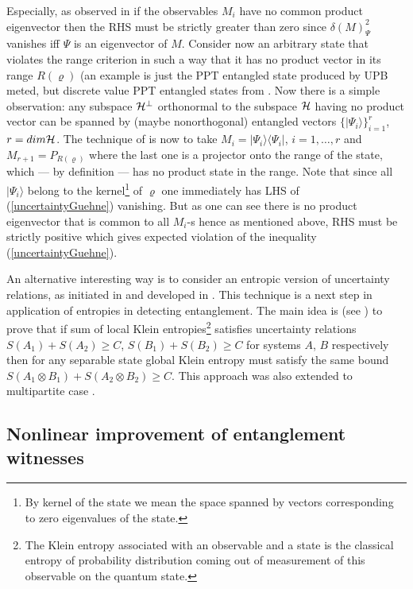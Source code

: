 \documentclass[rmp,12pt,preprint]{revtex4-2}
\begin{document}
Especially, as observed in \cite{OGuehne} if the observables $M_{i}$
have no common product eigenvector then the RHS must be strictly
greater than zero since $\delta(M)^{2}_{\Psi}$ vanishes iff $\Psi$
is an eigenvector of $M$. Consider now an arbitrary state that
violates the range criterion in such a way that it has no product
vector in its range $R(\varrho)$ (an example is just the PPT
entangled state produced by UPB meted, but discrete value PPT
entangled states from \cite{boundCV}. Now there is a simple
observation: any subspace ${\cal H}^{\perp}$ orthonormal to the
subspace ${\cal H}$ having no product vector can be spanned by
(maybe nonorthogonal) entangled vectors $\{ |\Psi_{i}\rangle
\}_{i=1}^{r}$, $r=dim{\cal H}$. The technique of \cite{OGuehne} is
now to take $M_{i}=|\Psi_i\rangle \langle \Psi_i|$, $i=1,\ldots,r$ and
$M_{r+1}=P_{R(\varrho)}$ where the last one is a projector onto the
range of the state, which --- by definition --- has no product state in
the range. Note that since all $|\Psi_i \rangle$ belong to the
kernel\footnote{By kernel of the state we mean the space spanned by
vectors corresponding to zero eigenvalues of the state.} of
$\varrho$  one immediately has LHS of (\ref{uncertaintyGuehne})
vanishing. But as one can see there is no product eigenvector that
is common to all $M_{i}$-s hence as mentioned above, RHS must be
strictly positive which gives expected violation of the inequality
(\ref{uncertaintyGuehne}).

An alternative interesting way is to consider an entropic version of
uncertainty relations, as initiated in \cite{Giovannetti2} and
developed in \cite{GuehneL2004-pra}. This technique is a next step in
application of entropies in detecting entanglement. The main idea is
(see \cite{GuehneL2004-pra}) to prove that if sum of local Klein
entropies\footnote{The Klein entropy associated with an observable and
  a state is the classical entropy of probability distribution coming
  out of measurement of this observable on the quantum state.}
satisfies uncertainty relations $S(A_{1}) + S(A_{2})\geq C$, $S(B_{1})
+ S(B_{2})\geq C$ for systems $A$, $B$ respectively then for any
separable state global Klein entropy must satisfy the same bound
$S(A_{1} \otimes B_{1}) + S(A_{2} \otimes B_{2})\geq C$. This approach
was also extended to multipartite case \cite{GuehneL2004-pra}.



\subsection{Nonlinear improvement of entanglement witnesses}
\label{subsec:NonlinearImprovement}
\end{document}
